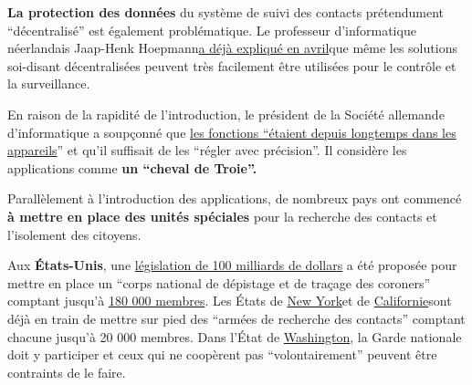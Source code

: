 \textbf{La protection des données} du système de suivi des contacts
prétendument ``décentralisé'' est également problématique. Le professeur
d'informatique néerlandais Jaap-Henk
Hoepmann\href{http://blog.xot.nl/2020/04/11/stop-the-apple-and-google-contact-tracing-platform-or-be-ready-to-ditch-your-smartphone/}{a
déjà expliqué en avril}que même les solutions soi-disant décentralisées
peuvent très facilement être utilisées pour le contrôle et la
surveillance.

En raison de la rapidité de l'introduction, le président de la Société
allemande d'informatique a soupçonné que
\href{https://www.heise.de/news/Informatiker-Die-Corona-App-ist-wie-ein-trojanisches-Pferd-4764560.html}{les
fonctions ``étaient depuis longtemps dans les appareils}'' et qu'il
suffisait de les ``régler avec précision''. Il considère les
applications comme \textbf{un ``cheval de Troie''.}

Parallèlement à l'introduction des applications, de nombreux pays ont
commencé \textbf{à mettre en place des unités spéciales} pour la
recherche des contacts et l'isolement des citoyens.

Aux \textbf{États-Unis}, une
\href{https://heavy.com/news/2020/05/hr-6666-trace-bill-bobby-rush/}{législation
de 100 milliards de dollars} a été proposée pour mettre en place un
``corps national de dépistage et de traçage des coroners'' comptant
jusqu'à
\href{https://www.washingtonpost.com/opinions/2020/05/29/corona-corps-could-fight-virus-youth-unemployment/}{180
000 membres}. Les États de
\href{https://www.jhsph.edu/news/news-releases/2020/johns-hopkins-and-bloomberg-philanthropies-with-new-york-state-launch-online-course-to-train-army-of-contact-tracers-to-slow-spread-of-COVID-19.html}{New
York}et de
\href{https://timesofsandiego.com/tech/2020/05/06/california-training-a-20000-person-army-of-coronavirus-tracers/}{Californie}sont
déjà en train de mettre sur pied des ``armées de recherche des
contacts'' comptant chacune jusqu'à 20 000 membres. Dans l'État de
\href{https://lynnwoodtimes.com/2020/05/12/governor-inslee-lays-out-statewide-contact-tracing-plan-for-covid-19/}{Washington},
la Garde nationale doit y participer et ceux qui ne coopèrent pas
``volontairement'' peuvent être contraints de le faire.

